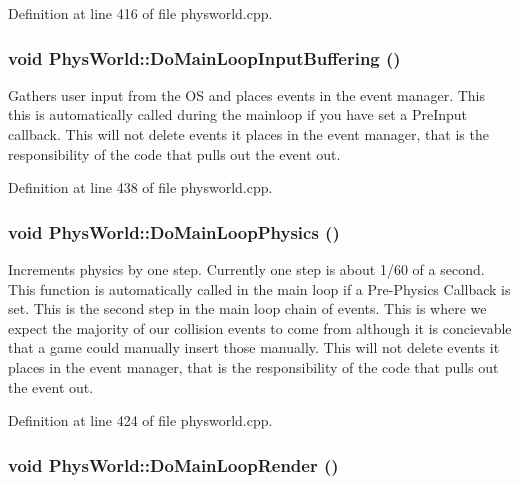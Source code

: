 Definition at line 416 of file physworld.cpp.\hypertarget{classPhysWorld_a81b3f0dcc0a90d039623f696343e6e9c}{
\subsubsection[{DoMainLoopInputBuffering}]{\setlength{\rightskip}{0pt plus 5cm}void PhysWorld::DoMainLoopInputBuffering ()}}
\label{db/df5/classPhysWorld_a81b3f0dcc0a90d039623f696343e6e9c}


Gathers user input from the OS and places events in the event manager. This this is automatically called during the mainloop if you have set a PreInput callback. This will not delete events it places in the event manager, that is the responsibility of the code that pulls out the event out. 

Definition at line 438 of file physworld.cpp.\hypertarget{classPhysWorld_a994d7d8c4a9a0c003c3e7d89be7b399b}{
\subsubsection[{DoMainLoopPhysics}]{\setlength{\rightskip}{0pt plus 5cm}void PhysWorld::DoMainLoopPhysics ()}}
\label{db/df5/classPhysWorld_a994d7d8c4a9a0c003c3e7d89be7b399b}


Increments physics by one step. Currently one step is about 1/60 of a second. This function is automatically called in the main loop if a Pre-\/Physics Callback is set. This is the second step in the main loop chain of events. This is where we expect the majority of our collision events to come from although it is concievable that a game could manually insert those manually. This will not delete events it places in the event manager, that is the responsibility of the code that pulls out the event out. 

Definition at line 424 of file physworld.cpp.\hypertarget{classPhysWorld_a8f33541d67164a2452e568443e9905be}{
\subsubsection[{DoMainLoopRender}]{\setlength{\rightskip}{0pt plus 5cm}void PhysWorld::DoMainLoopRender ()}}
\label{db/df5/classPhysWorld_a8f33541d67164a2452e568443e9905be}


